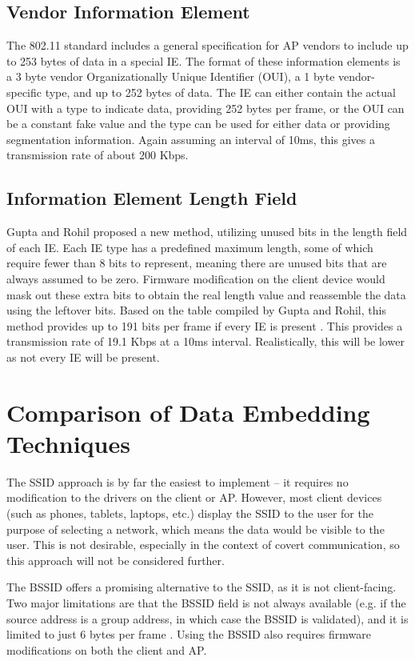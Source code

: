 \documentclass[letterpaper, 10 pt, conference]{ieeeconf}  %
\begin{document}
\subsection{Vendor Information Element}
The 802.11 standard includes a general specification for AP vendors to include up to 253 bytes of data in a special IE.  The format of these information elements is a 3 byte vendor Organizationally Unique Identifier (OUI), a 1 byte vendor-specific type, and up to 252 bytes of data. The IE can either contain the actual OUI with a type to indicate data, providing 252 bytes per frame, or the OUI can be a constant fake value and the type can be used for either data or providing segmentation information.  Again assuming an interval of 10ms, this gives a transmission rate of about 200 Kbps.

\subsection{Information Element Length Field}
Gupta and Rohil proposed a new method, utilizing unused bits in the length field of each IE. Each IE type has a predefined maximum length, some of which require fewer than 8 bits to represent, meaning there are unused bits that are always assumed to be zero.  Firmware modification on the client device would mask out these extra bits to obtain the real length value and reassemble the data using the leftover bits. Based on the table compiled by Gupta and Rohil, this method provides up to 191 bits per frame if every IE is present \cite{c2}. This provides a transmission rate of 19.1 Kbps at a 10ms interval.  Realistically, this will be lower as not every IE will be present.


\section{Comparison of Data Embedding Techniques}
The SSID approach is by far the easiest to implement -- it requires no modification to the drivers on the client or AP. However, most client devices (such as phones, tablets, laptops, etc.) display the SSID to the user for the purpose of selecting a network, which means the data would be visible to the user.  This is not desirable, especially in the context of covert communication, so this approach will not be considered further.

The BSSID offers a promising alternative to the SSID, as it is not client-facing.  Two major limitations are that the BSSID field is not always available (e.g. if the source address is a group address, in which case the BSSID is validated), and it is limited to just 6 bytes per frame \cite{c2}.  Using the BSSID also requires firmware modifications on both the client and AP.
\end{document}
